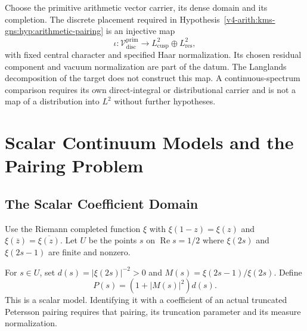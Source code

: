 \begin{hypothesis}
\label{v4-arith:kms-gns:prop:Vprim-placement}
Choose the primitive arithmetic vector carrier, its dense domain
and its completion. The discrete placement required in
Hypothesis~\ref{v4-arith:kms-gns:hyp:arithmetic-pairing} is an
injective map
\begin{equation}
\label{v4-arith:kms-gns:eq:placement}
 \iota:\mathcal V^{\mathrm{prim}}_{\mathrm{disc}}
 \longrightarrow L^2_{\mathrm{cusp}}\oplus L^2_{\mathrm{res}},
\end{equation}
with fixed central character and specified Haar normalization.
Its chosen residual component and vacuum normalization are part of
the datum. The Langlands decomposition of the target does not
construct this map. A continuous-spectrum comparison requires its
own direct-integral or distributional carrier and is not a map of
a distribution into \(L^2\) without further hypotheses.
\end{hypothesis}

\section{Scalar Continuum Models and the Pairing Problem}
\label{v4-arith:kms-gns:cycle4}
\subsection{The Scalar Coefficient Domain}
\label{v4-arith:kms-gns:cycle4:maass-selberg}

Use the Riemann completed function \(\xi\) with
\(\xi(1-z)=\xi(z)\) and \(\xi(\overline z)=\overline{\xi(z)}\).
Let \(U\) be the points \(s\) on \(\operatorname{Re}s=1/2\)
where \(\xi(2s)\) and \(\xi(2s-1)\) are finite and nonzero.

\begin{definition}
\label{v4-arith:kms-gns:lem:maass-selberg}
For \(s\in U\), set \(d(s)=|\xi(2s)|^{-2}>0\) and
\(M(s)=\xi(2s-1)/\xi(2s)\). Define
\begin{equation}
\label{v4-arith:kms-gns:eq:maass-selberg}
 P(s)=(1+|M(s)|^2)d(s).
\end{equation}
This is a scalar model. Identifying it with a coefficient of an
actual truncated Petersson pairing requires that pairing, its
truncation parameter and its measure normalization.
\end{definition}

